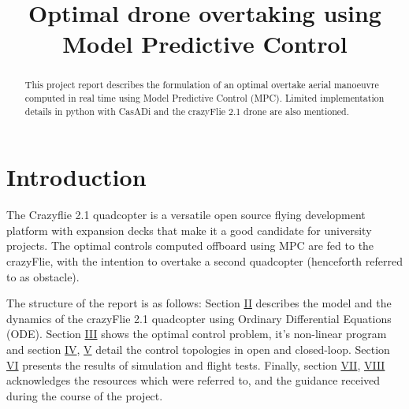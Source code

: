 \documentclass[conference]{IEEEtran}
\begin{document}
\title{Optimal drone overtaking using Model Predictive Control\\}
\author{
}

\maketitle

\begin{abstract}
This project report describes the formulation of an optimal overtake aerial manoeuvre computed in real time using Model Predictive Control (MPC). Limited implementation details in python with CasADi and the crazyFlie 2.1 drone are also mentioned.

\end{abstract}

\section{Introduction}\label{Introduction}
The Crazyflie 2.1 quadcopter is a versatile open source flying development platform with expansion decks that make it a good candidate for university projects. The optimal controls computed offboard using MPC are fed to the crazyFlie, with the intention to overtake a second quadcopter (henceforth referred to as obstacle).

The structure of the report is as follows: Section \hyperref[Section2]{II} describes the model and the dynamics of the crazyFlie 2.1 quadcopter using Ordinary Differential Equations (ODE). Section \hyperref[Section3]{III} shows the optimal control problem, it's non-linear program and section \hyperref[Section4]{IV}, \hyperref[Section5]{V} detail the control topologies in open and closed-loop. Section \hyperref[Section6]{VI} presents the results 
of simulation and flight tests. Finally, section \hyperref[Section7]{VII}, \hyperref[Section8]{VIII} acknowledges the resources which were referred to, and the guidance received during the course of the project.
\end{document}
